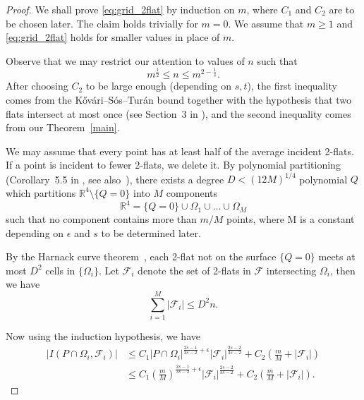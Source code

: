 \documentclass[11pt]{article}
\theoremstyle{definition}
\begin{document}
\begin{proof}

We shall prove \eqref{eq:grid_2flat} by induction on $m$, where $C_1$ and $C_2$ are to be chosen later. The claim holds trivially for $m=0$. We assume that $m \geq 1$ and \eqref{eq:grid_2flat} holds for smaller values in place of $m$.

Observe that we may restrict our attention to values of $n$ such that \begin{equation*}
    m^{\frac{1}{2}}\leq n \leq m^{2-\frac{1}{s}}.
\end{equation*} After choosing $C_2$ to be large enough (depending on $s,t$), the first inequality comes from the K\H{o}v\'ari--S\'os--Tur\'an bound together with the hypothesis that two flats intersect at most once (see Section~3 in \cite{solymosi2012incidence}), and the second inequality comes from our Theorem~\ref{main}.

We may assume that every point has at least half of the average incident 2-flats. If a point is incident to fewer 2-flats, we delete it. By polynomial partitioning (Corollary~5.5 in \cite{solymosi2012incidence}, see also~\cite{guth2015erdHos}), there exists a degree $D < (12M)^{1/4}$ polynomial $Q$ which partitions $\mathbb{R}^4 \setminus \{ Q=0 \}$ into $M$ components
\begin{equation*}
    \mathbb{R}^4 = \{ Q=0 \} \cup \Omega_1 \cup \dots \cup \Omega_M
\end{equation*} such that no component contains more than $m/M$ points, where M is a constant depending on $\epsilon$ and $s$ to be determined later.

By the Harnack curve theorem~\cite{harnack1876ueber}, each 2-flat not on the surface $\{Q=0\}$ meets at most $D^2$ cells in $\{\Omega_i\}$. Let $\mathcal{F}_i$ denote the set of 2-flats in $\mathcal{F}$ intersecting $\Omega_i$, then we have
\begin{equation*}
    \sum_{i=1}^{M} |\mathcal{F}_i| \leq D^2n.
\end{equation*}

Now using the induction hypothesis, we have
\begin{align*}
    |I(P \cap \Omega_i,\mathcal{F}_i)| 
    &\leq C_1 |P \cap \Omega_i|^{\frac{2s-1}{3s-2}+\epsilon} |\mathcal{F}_i|^{\frac{2s-2}{3s-2}} + C_2 \left( \frac{m}{M} + |\mathcal{F}_i| \right)\\
    &\leq C_1 \left( \frac{m}{M} \right) ^{\frac{2s-1}{3s-2}+\epsilon} |\mathcal{F}_i|^{\frac{2s-2}{3s-2}} + C_2 \left( \frac{m}{M} + |\mathcal{F}_i| \right).
\end{align*}


\end{proof}
\end{document}
